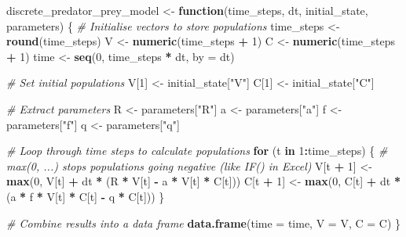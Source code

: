 \documentclass[
  a4paper]{book}
\newenvironment{Shaded}{\begin{snugshade}}{\end{snugshade}}
\newcommand{\AttributeTok}[1]{\textcolor[rgb]{0.13,0.29,0.53}{#1}}
\newcommand{\CommentTok}[1]{\textcolor[rgb]{0.56,0.35,0.01}{\textit{#1}}}
\newcommand{\ControlFlowTok}[1]{\textcolor[rgb]{0.13,0.29,0.53}{\textbf{#1}}}
\newcommand{\DecValTok}[1]{\textcolor[rgb]{0.00,0.00,0.81}{#1}}
\newcommand{\FunctionTok}[1]{\textcolor[rgb]{0.13,0.29,0.53}{\textbf{#1}}}
\newcommand{\NormalTok}[1]{#1}
\newcommand{\OtherTok}[1]{\textcolor[rgb]{0.56,0.35,0.01}{#1}}
\newcommand{\SpecialCharTok}[1]{\textcolor[rgb]{0.81,0.36,0.00}{\textbf{#1}}}
\newcommand{\StringTok}[1]{\textcolor[rgb]{0.31,0.60,0.02}{#1}}
\begin{document}
\begin{Shaded}
\begin{Highlighting}[]
\NormalTok{discrete\_predator\_prey\_model }\OtherTok{\textless{}{-}} \ControlFlowTok{function}\NormalTok{(time\_steps, dt, initial\_state, parameters) \{}
  \CommentTok{\# Initialise vectors to store populations}
\NormalTok{  time\_steps }\OtherTok{\textless{}{-}} \FunctionTok{round}\NormalTok{(time\_steps)}
\NormalTok{  V }\OtherTok{\textless{}{-}} \FunctionTok{numeric}\NormalTok{(time\_steps }\SpecialCharTok{+} \DecValTok{1}\NormalTok{)}
\NormalTok{  C }\OtherTok{\textless{}{-}} \FunctionTok{numeric}\NormalTok{(time\_steps }\SpecialCharTok{+} \DecValTok{1}\NormalTok{)}
\NormalTok{  time }\OtherTok{\textless{}{-}} \FunctionTok{seq}\NormalTok{(}\DecValTok{0}\NormalTok{, time\_steps }\SpecialCharTok{*}\NormalTok{ dt, }\AttributeTok{by =}\NormalTok{ dt)}
  
  \CommentTok{\# Set initial populations}
\NormalTok{  V[}\DecValTok{1}\NormalTok{] }\OtherTok{\textless{}{-}}\NormalTok{ initial\_state[}\StringTok{"V"}\NormalTok{]}
\NormalTok{  C[}\DecValTok{1}\NormalTok{] }\OtherTok{\textless{}{-}}\NormalTok{ initial\_state[}\StringTok{"C"}\NormalTok{]}
  
  \CommentTok{\# Extract parameters}
\NormalTok{  R }\OtherTok{\textless{}{-}}\NormalTok{ parameters[}\StringTok{"R"}\NormalTok{]}
\NormalTok{  a }\OtherTok{\textless{}{-}}\NormalTok{ parameters[}\StringTok{"a"}\NormalTok{]}
\NormalTok{  f }\OtherTok{\textless{}{-}}\NormalTok{ parameters[}\StringTok{"f"}\NormalTok{]}
\NormalTok{  q }\OtherTok{\textless{}{-}}\NormalTok{ parameters[}\StringTok{"q"}\NormalTok{]}
  
  \CommentTok{\# Loop through time steps to calculate populations}
  \ControlFlowTok{for}\NormalTok{ (t }\ControlFlowTok{in} \DecValTok{1}\SpecialCharTok{:}\NormalTok{time\_steps) \{}
    \CommentTok{\# max(0, ...) stops populations going negative (like IF() in Excel)}
\NormalTok{    V[t }\SpecialCharTok{+} \DecValTok{1}\NormalTok{] }\OtherTok{\textless{}{-}} \FunctionTok{max}\NormalTok{(}\DecValTok{0}\NormalTok{, V[t] }\SpecialCharTok{+}\NormalTok{ dt }\SpecialCharTok{*}\NormalTok{ (R }\SpecialCharTok{*}\NormalTok{ V[t] }\SpecialCharTok{{-}}\NormalTok{ a }\SpecialCharTok{*}\NormalTok{ V[t] }\SpecialCharTok{*}\NormalTok{ C[t]))}
\NormalTok{    C[t }\SpecialCharTok{+} \DecValTok{1}\NormalTok{] }\OtherTok{\textless{}{-}} \FunctionTok{max}\NormalTok{(}\DecValTok{0}\NormalTok{, C[t] }\SpecialCharTok{+}\NormalTok{ dt }\SpecialCharTok{*}\NormalTok{ (a }\SpecialCharTok{*}\NormalTok{ f }\SpecialCharTok{*}\NormalTok{ V[t] }\SpecialCharTok{*}\NormalTok{ C[t] }\SpecialCharTok{{-}}\NormalTok{ q }\SpecialCharTok{*}\NormalTok{ C[t]))}
\NormalTok{  \}}
  
  \CommentTok{\# Combine results into a data frame}
  \FunctionTok{data.frame}\NormalTok{(}\AttributeTok{time =}\NormalTok{ time, }\AttributeTok{V =}\NormalTok{ V, }\AttributeTok{C =}\NormalTok{ C)}
\NormalTok{\}}
\end{Highlighting}
\end{Shaded}
\end{document}
